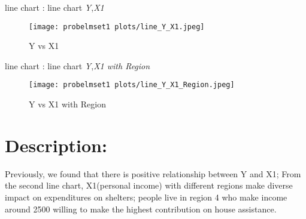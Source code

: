 \documentclass[12pt,letterpaper]{article}
\begin{document}
line chart  : line chart \emph{Y},\emph{X1}
\begin{figure}[htp]
    \centering
    \texttt{[image: probelmset1 plots/line\_Y\_X1.jpeg]}
    \caption{Y vs X1 }
    \label{line chart Y vs X1}
\end{figure}
\newpage
line chart  : line chart \emph{Y},\emph{X1 with Region}
\begin{figure}[htp]
    \centering
    \texttt{[image: probelmset1 plots/line\_Y\_X1\_Region.jpeg]}
    \caption{Y vs X1 with Region }
    \label{line chart Y vs X1 with Region}
\end{figure}

 

\section*{Description:}
Previously, we found that there is positive relationship between Y and X1; From the second line chart, X1(personal income) with different regions make diverse impact on expenditures on shelters; people live in region 4 who make income around 2500 willing to make the highest contribution on house assistance.
\end{document}
